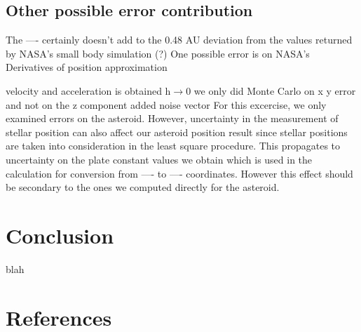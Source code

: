 \documentclass[authoryear, 12pt,5p, times]{elsarticle}
\begin{document}
\subsection{Other possible error contribution}
The ---- certainly doesn't add to the 0.48 AU deviation from the values returned by NASA's small body simulation (?)
One possible error is on NASA's
Derivatives of position approximation

velocity and acceleration is obtained 
h$\rightarrow$0 
we only did Monte Carlo on x y error and not on the z component
added noise vector 
For this excercise, we only examined errors on the asteroid. However, uncertainty in the measurement of stellar position can also affect our asteroid position result since stellar positions are taken into consideration in the least square procedure. This propagates to uncertainty on the plate constant values we obtain which is used in the calculation for conversion from ---- to ---- coordinates. However this effect should be secondary to the ones we computed directly for the asteroid. 
\section{Conclusion}
blah
 \section*{References}
\end{document}
